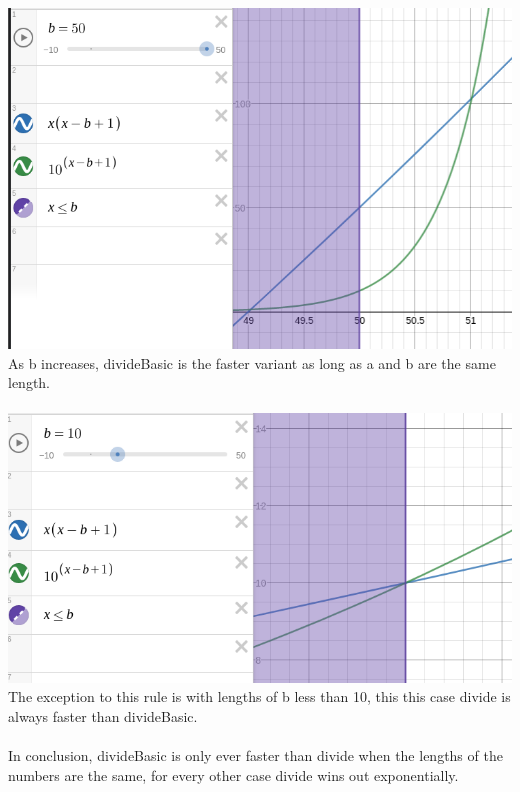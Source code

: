 \documentclass[journal,a4paper]{article}
\begin{document}
\begin{enumerate}[(a)]
	\includegraphics[scale=2]{divide-complexity-2} \\
	As b increases, divideBasic is the faster variant as long as a and b are the same length.
	\\\\
	\includegraphics[scale=0.5]{divide-complexity-3} \\
	The exception to this rule is with lengths of b less than 10, this this case divide is always faster than divideBasic.
	\\\\
	In conclusion, divideBasic is only ever faster than divide when the lengths of the numbers are the same, for every other case divide wins out exponentially.	
\end{enumerate}
\end{document}
